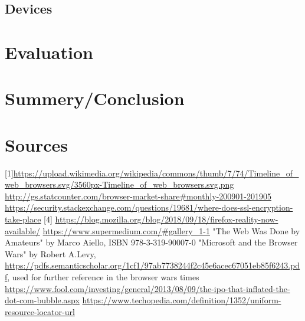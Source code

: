 \documentclass[runningheads]{llncs}
\begin{document}
		\subsection{Devices}

	\section{Evaluation}

	\section{Summery/Conclusion}
	\section{Sources}
	[1]\url{https://upload.wikimedia.org/wikipedia/commons/thumb/7/74/Timeline_of_web_browsers.svg/3560px-Timeline_of_web_browsers.svg.png}
	\newline
	[2] \url{http://gs.statcounter.com/browser-market-share#monthly-200901-201905}
	\newline
	[3]\url{https://security.stackexchange.com/questions/19681/where-does-ssl-encryption-take-place}
	[4]
	\url{https://blog.mozilla.org/blog/2018/09/18/firefox-reality-now-available/}
	\newline
	[5]
	\url{https://www.supermedium.com/#gallery_1-1}
	\newline
	[6] "The Web Was Done by Amateurs" by Marco Aiello, ISBN 978-3-319-90007-0 \newline
	[7] "Microsoft and the Browser Wars" by Robert A.Levy, \url{https://pdfs.semanticscholar.org/1cf1/97ab7738244f2c45e6acec67051eb85f6243.pdf}, used for further reference in the browser wars times
	\newline
	[8] \url{https://www.fool.com/investing/general/2013/08/09/the-ipo-that-inflated-the-dot-com-bubble.aspx}
	\newline
	[9] \url{https://www.techopedia.com/definition/1352/uniform-resource-locator-url}
\end{document}
